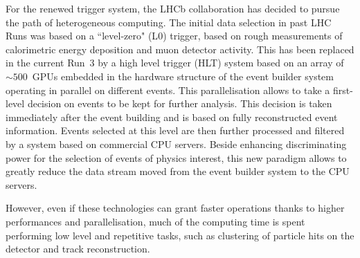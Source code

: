 For the renewed trigger system, the LHCb collaboration has decided to pursue the path of heterogeneous computing. The initial data selection in past LHC Runs was based on a ``level-zero" (L$0$) trigger, based on rough measurements of calorimetric energy deposition and muon detector activity. This has been replaced in the current Run~3 by a high level trigger (HLT) system based on an array of $\sim 500$~GPUs embedded in the hardware structure of the event builder system operating in parallel on different events. This parallelisation allows to take a first-level decision on events to be kept for further analysis. This decision is taken immediately after the event building and is based on fully reconstructed event information. Events selected at this level are then further processed and filtered by a system based on commercial CPU servers. Beside enhancing discriminating power for the selection of events of physics interest, this new paradigm allows to greatly reduce the data stream moved from the event builder system to the CPU servers. 




However, even if these technologies can grant faster operations thanks to higher performances and parallelisation, much of the computing time is spent performing low level and repetitive tasks, such as clustering of particle hits on the detector and track reconstruction. 

